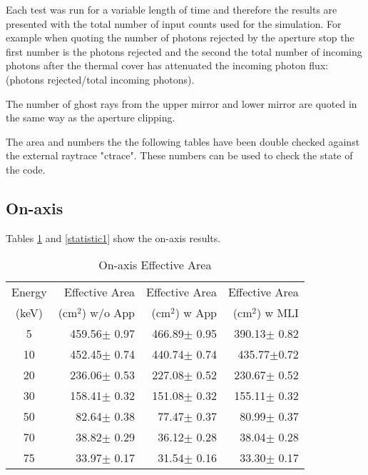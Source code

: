 Each test was run for a variable length of time and therefore the results are presented with the total number of input counts used for the simulation. For example when quoting the number of photons rejected by the aperture stop the first number is the photons rejected and the second the total number of incoming photons after the thermal cover has attenuated the incoming photon flux: (photons rejected/total incoming photons).

The number of ghost rays from the upper mirror and lower mirror are quoted in the same way as the aperture clipping.

The area and numbers the the following tables have been double checked against the external raytrace "ctrace". These numbers can be used to check the state of the code.

\subsection{On-axis}
Tables \ref{ea1} and \ref{statistic1} show the on-axis results. 

\begin{table}[h]
\caption{On-axis Effective Area}
\begin{center}
\begin{tabular}{|c|r|r|r|}
\hline
Energy & Effective Area & Effective Area & Effective Area \\
(keV) & (cm$^2$) w/o App & (cm$^2$) w App &(cm$^2$) w MLI \\
\hline
\hline
5 & 459.56$\pm$ 0.97 & 466.89$\pm$ 0.95 & 390.13$\pm$ 0.82 \\
10 & 452.45$\pm$ 0.74 & 440.74$\pm$ 0.74&435.77$\pm$0.72 \\
20 & 236.06$\pm$ 0.53 & 227.08$\pm$ 0.52 & 230.67$\pm$ 0.52 \\
30 & 158.41$\pm$ 0.32 & 151.08$\pm$ 0.32 & 155.11$\pm$ 0.32 \\
50 & 82.64$\pm$ 0.38 & 77.47$\pm$ 0.37 & 80.99$\pm$ 0.37 \\
70 & 38.82$\pm$ 0.29 & 36.12$\pm$ 0.28 & 38.04$\pm$ 0.28 \\
75 & 33.97$\pm$ 0.17 & 31.54$\pm$ 0.16 & 33.30$\pm$ 0.17 \\
\hline
\end{tabular}
\end{center}
\label{ea1}
\end{table}

